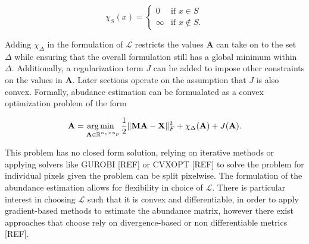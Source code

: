 \begin{equation}
    \label{ae:indfunc}
    \chi_{S}(x) = 
            \begin{cases}
            0 &\text{if } x \in S \\
            \infty &\text{if } x \not \in S.
            \end{cases}
\end{equation}

Adding $\chi_\Delta$ in the formulation of $\mathcal{L}$ restricts the values $\mathbf{A}$ can take on to the set $\Delta$ while ensuring that the overall formulation still has a global minimum within $\Delta$. Additionally, a regularization term $J$ can be added to impose other constraints on the values in $\mathbf{A}$. Later sections operate on the assumption that $J$ is also convex. Formally, abudance estimation can be formualated as a convex optimization problem of the form

\begin{equation}
    \label{ae:ae-min-1}
    \mathbf{A} = \operatorname*{arg\,min \;\;}_{\mathbf{A} \in \mathbb{R}^{n_e \times n_p}} \frac{1}{2}\|\mathbf{MA} - \mathbf{X}\|_F^2 + \chi_\Delta(\mathbf{A}) + J(\mathbf{A}).
\end{equation}

This problem has no closed form solution, relying on iterative methods or applying solvers like GUROBI [REF] or CVXOPT [REF] to solve the problem for individual pixels given the problem can be split pixelwise. The formulation of the abundance estimation allows for flexibility in choice of $\mathcal{L}$. There is particular interest in choosing $\mathcal{L}$ such that it is convex and differentiable, in order to apply gradient-based methods to estimate the abundance matrix, however there exist approaches that choose rely on divergence-based or non differentiable metrics [REF].
